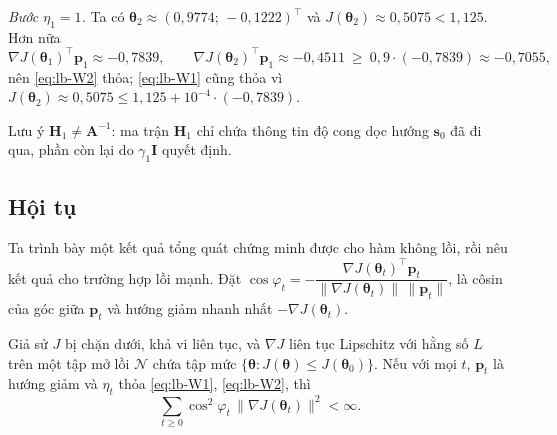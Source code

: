 \begin{example}
\emph{Bước $\eta_1=1$.} Ta có $\boldsymbol{\theta}_2\approx(0{,}9774;\,-0{,}1222)^{\top}$ và $J(\boldsymbol{\theta}_2)\approx0{,}5075<1{,}125$. Hơn nữa
\begin{equation*}
  \nabla J(\boldsymbol{\theta}_1)^{\top}\mathbf{p}_1\approx-0{,}7839,
  \qquad
  \nabla J(\boldsymbol{\theta}_2)^{\top}\mathbf{p}_1\approx-0{,}4511\ \ge\ 0{,}9\cdot(-0{,}7839)\approx-0{,}7055,
\end{equation*}
nên \eqref{eq:lb-W2} thỏa; \eqref{eq:lb-W1} cũng thỏa vì $J(\boldsymbol{\theta}_2)\approx0{,}5075\le1{,}125+10^{-4}\cdot(-0{,}7839)$.

Lưu ý $\mathbf{H}_1\neq\mathbf{A}^{-1}$: ma trận $\mathbf{H}_1$ chỉ chứa thông tin độ cong dọc hướng $\mathbf{s}_0$ đã đi qua, phần còn lại do $\gamma_1\mathbf{I}$ quyết định.
\end{example}

\subsection{Hội tụ}

Ta trình bày một kết quả tổng quát chứng minh được cho hàm không lồi, rồi nêu kết quả cho trường hợp lồi mạnh. Đặt $\cos\varphi_t=-\dfrac{\nabla J(\boldsymbol{\theta}_t)^{\top}\mathbf{p}_t}{\|\nabla J(\boldsymbol{\theta}_t)\|\,\|\mathbf{p}_t\|}$, là côsin của góc giữa $\mathbf{p}_t$ và hướng giảm nhanh nhất $-\nabla J(\boldsymbol{\theta}_t)$.

\begin{theorem}[Zoutendijk]\label{thm:lb-zoutendijk}
Giả sử $J$ bị chặn dưới, khả vi liên tục, và $\nabla J$ liên tục Lipschitz với hằng số $L$ trên một tập mở lồi $\mathcal{N}$ chứa tập mức $\{\boldsymbol{\theta}:J(\boldsymbol{\theta})\le J(\boldsymbol{\theta}_0)\}$. Nếu với mọi $t$, $\mathbf{p}_t$ là hướng giảm và $\eta_t$ thỏa \eqref{eq:lb-W1}, \eqref{eq:lb-W2}, thì
\begin{equation*}
  \sum_{t\ge0}\cos^2\varphi_t\,\|\nabla J(\boldsymbol{\theta}_t)\|^2<\infty .
\end{equation*}
\end{theorem}

